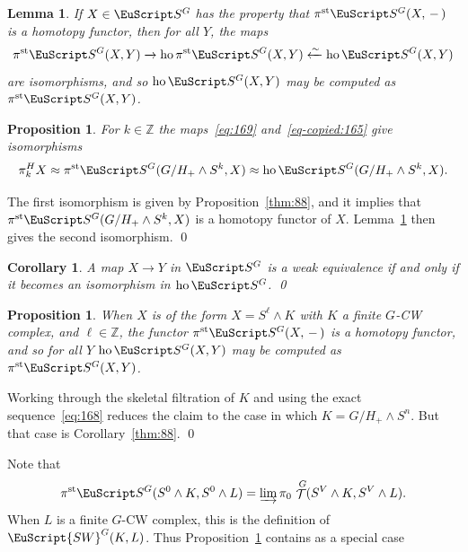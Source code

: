 \documentclass{amsart}
\newtheorem{cor}[equation]{Corollary}
\newtheorem{lem}[equation]{Lemma}
\newtheorem{prop}[equation]{Proposition}
\theoremstyle{definition}
\theoremstyle{remark}
\newenvironment{pf}{\bigskip{\em Proof:\/}}{\qed\medskip}
\newcommand{\Z}{{\mathbb Z}}
\newcommand{\slot}{\,-\,}
\newcommand{\spectra}{\EuScript S}
\newcommand{\swg}[1]{\EuScript {SW}^{#1}}
\DeclareMathOperator{\ho}{ho}
\DeclareMathOperator{\spaces}{\mathcal T}
\newcommand{\ugspaces}[1]{\spaces^{#1}}
\newcommand{\ugspectra}[1]{\spectra^{#1}}
\newcommand{\pist}{\pi^{\text{st}}}
\begin{document}
\begin{lem}
\label{thm:249} 
If $X\in\ugspectra{G}$ has the property that
$\pist\ugspectra{G}(X,\slot)$ is a homotopy functor, then for all $Y$,
the maps
\begin{equation}
\label{eq-copied:165}
\pist\ugspectra{G}(X,Y) \xrightarrow{}
\ho\pist\ugspectra{G}(X,Y)\xleftarrow{\sim}\ho\ugspectra{G}(X,Y)
\end{equation}
are isomorphisms, and so $\ho\ugspectra{G}(X,Y)$ may be computed as
$\pist\ugspectra{G}(X,Y)$.
\end{lem}

\begin{prop}
\label{thm-copied:251}
For $k\in\Z$ the maps~\eqref{eq:169} and~\eqref{eq-copied:165} give isomorphisms
\[
\pi^{H}_{k}X\approx\pist\ugspectra{G}(G/H_{+}\wedge
S^{k},X)\approx\ho\ugspectra{G}(G/H_{+}\wedge S^{k},X).
\]
\end{prop}

\begin{pf}
The first isomorphism is given by Proposition~\ref{thm:88}, and it implies
that $\pist\ugspectra{G}(G/H_{+}\wedge S^{k},X)$ is a homotopy
functor of $X$.  Lemma~\ref{thm:249} then gives the second isomorphism. 
\end{pf}


\begin{cor}
\label{thm-copied:253}
A map $X\to Y$ in $\ugspectra{G}$ is a weak equivalence if and only if
it becomes an isomorphism in $\ho\ugspectra{G}$. \qed
\end{cor}

\begin{prop}
\label{thm-copied:244} When $X$ is of the form $X=S^{\ell}\wedge K$
with $K$ a finite $G$-CW complex, and $\ell\in\Z$, the functor
$\pist\ugspectra{G}(X,\slot)$ is a homotopy functor, and so for all $Y$
$\ho\ugspectra{G}(X,Y)$ may be computed as $\pist\ugspectra{G}(X,Y)$.
\end{prop}

\begin{pf}
Working through the skeletal filtration of $K$ and using the exact
sequence~\eqref{eq:168} reduces the claim to the case in which
$K=G/H_{+}\wedge S^{n}$.  But that case is Corollary~\ref{thm:88}.
\end{pf}

Note that 
\[
\pist\ugspectra{G}(S^{0}\wedge K,S^{0}\wedge L) = 
\varinjlim \pi_{0}\,\ugspaces{G}(S^{V}\wedge K,S^{V}\wedge
L).
\]
When $L$ is a finite $G$-CW complex, this is the definition of
$\swg{G}(K,L)$.  Thus Proposition~\ref{thm-copied:244} contains as a
special case
\end{document}
